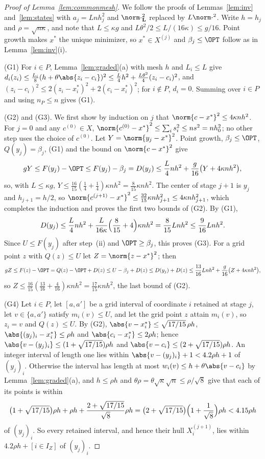 \begin{proof}[Proof of Lemma~\ref{lem:commonmesh}]
We follow the proofs of Lemmas~\ref{lem:inv} and~\ref{lem:states} with
$a_j=Lnh_j^2$ and $\norm\cdot_{\mathbf L}^2$ replaced by $L\norm\cdot^2$.
Write $h=h_j$ and $\rho=\sqrt{n\kappa}$, and note that $L\le\kappa g$ and
$L\theta^2/2\le L/(16\kappa)\le g/16$. Point growth makes $x^*$ the unique
minimizer, so $x^*\in X^{(j)}$ and $\beta_j\le\OPT$ follow as in
Lemma~\ref{lem:inv}(i).

(G1) For $i\in P$, Lemma~\ref{lem:graded}(a) with mesh $h$ and $L_i\le L$ give
$d_i(z_i)\le\frac{L_i}8(h+\theta\abs{z_i-c_i})^2\le\frac L4h^2
+\frac{L\theta^2}4(z_i-c_i)^2$, and
$(z_i-c_i)^2\le2(z_i-x_i^*)^2+2(c_i-x_i^*)^2$; for $i\notin P$, $d_i=0$.
Summing over $i\in P$ and using $n_P\le n$ gives (G1).

(G2) and (G3). We first show by induction on $j$ that
$\norm{c-x^*}^2\le4\kappa nh^2$. For $j=0$ and any $c^{(0)}\in X$,
$\norm{c^{(0)}-x^*}^2\le\sum_is_i^2\le ns^2=nh_0^2$; no other step uses the
choice of $c^{(0)}$. Let
$Y=\norm{y_j-x^*}^2$. Point growth, $\beta_j\le\OPT$, $Q(y_j)=\beta_j$, (G1)
and the bound on $\norm{c-x^*}^2$ give
\[
gY\le F(y_j)-\OPT\le F(y_j)-\beta_j=D(y_j)
\le\frac L4nh^2+\frac g{16}\bigl(Y+4\kappa nh^2\bigr),
\]
so, with $L\le\kappa g$, $Y\le\frac{16}{15}(\frac14+\frac14)\kappa nh^2
=\frac8{15}\kappa nh^2$. The center of stage $j+1$ is $y_j$ and
$h_{j+1}=h/2$, so $\norm{c^{(j+1)}-x^*}^2\le\frac{32}{15}\kappa nh_{j+1}^2
\le4\kappa nh_{j+1}^2$, which completes the induction and proves the first
two bounds of (G2). By (G1),
\[
D(y_j)\le\frac L4nh^2+\frac L{16\kappa}\Bigl(\frac8{15}+4\Bigr)\kappa nh^2
=\frac8{15}Lnh^2\le\frac9{16}Lnh^2 .
\]
Since $U\le F(y_j)$ after step~(ii) and $\OPT\ge\beta_j$, this proves (G3).
For a grid point $z$ with $Q(z)\le U$ let $Z=\norm{z-x^*}^2$; then
\[
gZ\le F(z)-\OPT=Q(z)-\OPT+D(z)\le U-\beta_j+D(z)\le D(y_j)+D(z)
\le\frac{13}{16}Lnh^2+\frac g{16}\bigl(Z+4\kappa nh^2\bigr),
\]
so $Z\le\frac{16}{15}(\frac{13}{16}+\frac4{16})\kappa nh^2
=\frac{17}{15}\kappa nh^2$, the last bound of (G2).

(G4) Let $i\in P$, let $[a,a']$ be a grid interval of coordinate $i$ retained
at stage $j$, let $v\in\{a,a'\}$ satisfy $m_i(v)\le U$, and let the grid
point $z$ attain $m_i(v)$, so $z_i=v$ and $Q(z)\le U$. By (G2),
$\abs{v-x_i^*}\le\sqrt{17/15}\,\rho h$, $\abs{(y_j)_i-x_i^*}\le\rho h$ and
$\abs{c_i-x_i^*}\le2\rho h$; hence
$\abs{v-(y_j)_i}\le(1+\sqrt{17/15})\rho h$ and
$\abs{v-c_i}\le(2+\sqrt{17/15})\rho h$. An integer interval of length one
lies within $\abs{v-(y_j)_i}+1<4.2\rho h+1$ of $(y_j)_i$. Otherwise the
interval has length at most $w_i(v)\le h+\theta\abs{v-c_i}$ by
Lemma~\ref{lem:graded}(a), and $h\le\rho h$ and
$\theta\rho=\theta\sqrt\kappa\sqrt n\le\rho/\sqrt8$ give that each of its
points is within
\[
\bigl(1+\sqrt{17/15}\bigr)\rho h+\rho h+\frac{2+\sqrt{17/15}}{\sqrt8}\rho h
=\bigl(2+\sqrt{17/15}\bigr)\Bigl(1+\frac1{\sqrt8}\Bigr)\rho h<4.15\rho h
\]
of $(y_j)_i$. So every retained interval, and hence their hull
$X_i^{(j+1)}$, lies within $4.2\rho h+[i\in I_Z]$ of $(y_j)_i$.


\end{proof}
